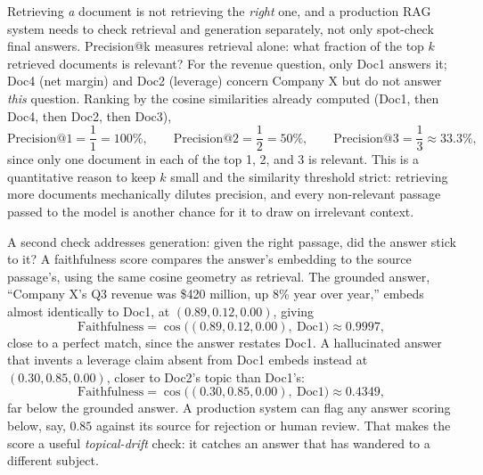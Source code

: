 \documentclass[../ai_in_finance]{subfiles}
\begin{document}
Retrieving \emph{a} document is not retrieving the \emph{right} one, and a production RAG system needs to check retrieval and generation separately, not only spot-check final answers. Precision@k measures retrieval alone: what fraction of the top $k$ retrieved documents is relevant? For the revenue question, only Doc1 answers it; Doc4 (net margin) and Doc2 (leverage) concern Company X but do not answer \emph{this} question. Ranking by the cosine similarities already computed (Doc1, then Doc4, then Doc2, then Doc3),
\begin{equation*}
\text{Precision@1} = \frac{1}{1} = 100\%, \qquad \text{Precision@2} = \frac{1}{2} = 50\%, \qquad \text{Precision@3} = \frac{1}{3} \approx 33.3\%,
\end{equation*}
since only one document in each of the top 1, 2, and 3 is relevant. This is a quantitative reason to keep $k$ small and the similarity threshold strict: retrieving more documents mechanically dilutes precision, and every non-relevant passage passed to the model is another chance for it to draw on irrelevant context.

A second check addresses generation: given the right passage, did the answer stick to it? A faithfulness score compares the answer's embedding to the source passage's, using the same cosine geometry as retrieval. The grounded answer, ``Company X's Q3 revenue was \$420 million, up 8\% year over year,'' embeds almost identically to Doc1, at $(0.89, 0.12, 0.00)$, giving
\begin{equation*}
\text{Faithfulness} = \cos\big((0.89, 0.12, 0.00),\ \text{Doc1}\big) \approx 0.9997,
\end{equation*}
close to a perfect match, since the answer restates Doc1. A hallucinated answer that invents a leverage claim absent from Doc1 embeds instead at $(0.30, 0.85, 0.00)$, closer to Doc2's topic than Doc1's:
\begin{equation*}
\text{Faithfulness} = \cos\big((0.30, 0.85, 0.00),\ \text{Doc1}\big) \approx 0.4349,
\end{equation*}
far below the grounded answer. A production system can flag any answer scoring below, say, $0.85$ against its source for rejection or human review. That makes the score a useful \emph{topical-drift} check: it catches an answer that has wandered to a different subject.
\end{document}
